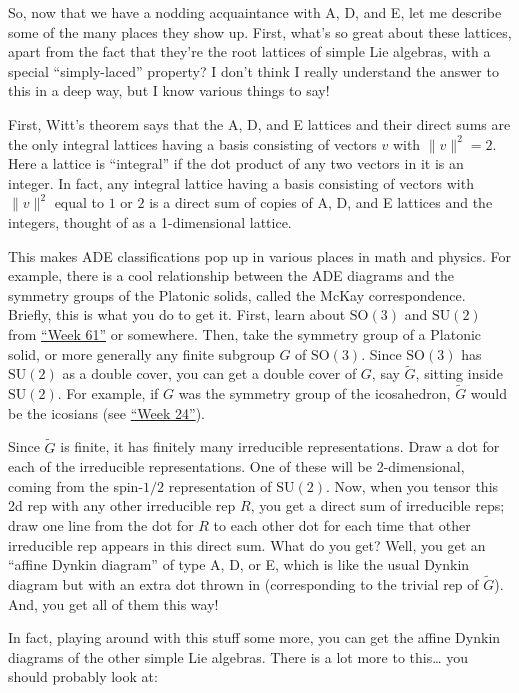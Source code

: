 \documentclass{article}
\begin{document}
So, now that we have a nodding acquaintance with A, D, and E, let me
describe some of the many places they show up. First, what's so great
about these lattices, apart from the fact that they're the root lattices
of simple Lie algebras, with a special ``simply-laced'' property? I
don't think I really understand the answer to this in a deep way, but I
know various things to say!

First, Witt's theorem says that the A, D, and E lattices and their
direct sums are the only integral lattices having a basis consisting of
vectors \(v\) with \(\|v\|^2 = 2\). Here a lattice is ``integral'' if
the dot product of any two vectors in it is an integer. In fact, any
integral lattice having a basis consisting of vectors with \(\|v\|^2\)
equal to \(1\) or \(2\) is a direct sum of copies of A, D, and E
lattices and the integers, thought of as a 1-dimensional lattice.

This makes ADE classifications pop up in various places in math and
physics. For example, there is a cool relationship between the ADE
diagrams and the symmetry groups of the Platonic solids, called the
McKay correspondence. Briefly, this is what you do to get it. First,
learn about \(\mathrm{SO}(3)\) and \(\mathrm{SU}(2)\) from
\protect\hyperlink{week61}{``Week 61''} or somewhere. Then, take the
symmetry group of a Platonic solid, or more generally any finite
subgroup \(G\) of \(\mathrm{SO}(3)\). Since \(\mathrm{SO}(3)\) has
\(\mathrm{SU}(2)\) as a double cover, you can get a double cover of
\(G\), say \(\widetilde{G}\), sitting inside \(\mathrm{SU}(2)\). For
example, if \(G\) was the symmetry group of the icosahedron,
\(\widetilde{G}\) would be the icosians (see
\protect\hyperlink{week24}{``Week 24''}).

Since \(\widetilde{G}\) is finite, it has finitely many irreducible
representations. Draw a dot for each of the irreducible representations.
One of these will be 2-dimensional, coming from the spin-\(1/2\)
representation of \(\mathrm{SU}(2)\). Now, when you tensor this 2d rep
with any other irreducible rep \(R\), you get a direct sum of
irreducible reps; draw one line from the dot for \(R\) to each other dot
for each time that other irreducible rep appears in this direct sum.
What do you get? Well, you get an ``affine Dynkin diagram'' of type A,
D, or E, which is like the usual Dynkin diagram but with an extra dot
thrown in (corresponding to the trivial rep of \(\widetilde{G}\)). And,
you get all of them this way!

In fact, playing around with this stuff some more, you can get the
affine Dynkin diagrams of the other simple Lie algebras. There is a lot
more to this\ldots{} you should probably look at:
\end{document}
